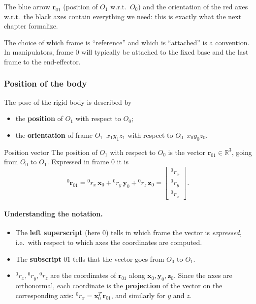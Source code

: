 The blue arrow $\mathbf{r}_{01}$ (position of $O_1$ w.r.t.\ $O_0$) and the orientation of the red axes w.r.t.\ the black axes contain everything we need: this is exactly what the next chapter formalize.

The choice of which frame is ``reference'' and which is ``attached'' is a convention. In manipulators, frame 0 will typically be attached to the fixed base and the last frame to the end-effector.

\subsubsection{Position of the body}

The pose of the rigid body is described by
\begin{itemize}
    \item the \textbf{position} of $O_1$ with respect to $O_0$;
    \item the \textbf{orientation} of frame $O_1$--$x_1y_1z_1$ with respect to $O_0$--$x_0y_0z_0$.
\end{itemize}

\begin{defbox}{Position vector}
The position of $O_1$ with respect to $O_0$ is the vector $\mathbf{r}_{01}\in\mathbb{R}^3$, going from $O_0$ to $O_1$. Expressed in frame 0 it is
\[
{}^{0}\mathbf{r}_{01}={}^{0}r_x\,\mathbf{x}_0+{}^{0}r_y\,\mathbf{y}_0+{}^{0}r_z\,\mathbf{z}_0=
\begin{bmatrix}{}^{0}r_x\\ {}^{0}r_y\\ {}^{0}r_z\end{bmatrix}.
\]
\end{defbox}

\paragraph{Understanding the notation.}
\begin{itemize}
    \item The \textbf{left superscript} (here $0$) tells in which frame the vector is \emph{expressed}, i.e.\ with respect to which axes the coordinates are computed.
    \item The \textbf{subscript} $01$ tells that the vector goes from $O_0$ to $O_1$.
    \item ${}^0r_x,{}^0r_y,{}^0r_z$ are the coordinates of $\mathbf{r}_{01}$ along $\mathbf{x}_0,\mathbf{y}_0,\mathbf{z}_0$. Since the axes are orthonormal, each coordinate is the \textbf{projection} of the vector on the corresponding axis: ${}^0r_x=\mathbf{x}_0^T\,\mathbf{r}_{01}$, and similarly for $y$ and $z$.
\end{itemize}

